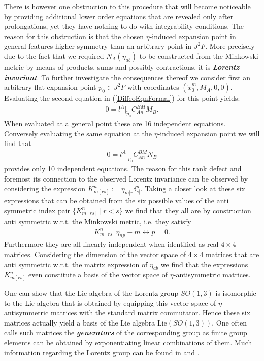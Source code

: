 \documentclass[a4paper,12pt, DIV=14, BCOR=5mm, twoside, headsepline, numbers=noenddot]{scrbook}
\begin{document}
There is however one obstruction to this procedure that will become noticeable by providing additional lower order equations that are revealed only after prolongations, yet they have nothing to do with integrability conditions. 
The reason for this obstruction is that the chosen $\eta$-induced expansion point in general features higher symmetry than an arbitrary point in $J^2F$. More precisely due to the fact that we required $N_A(\eta_{ab})$ to be constructed from the Minkowski metric by means of products, sums and possibly contractions, it is \textit{\textbf{Lorentz invariant}}. To further investigate the consequences thereof we consider first an arbitrary flat expansion point $\tilde{p}_0 \in J^2F$ with coordinates $(\tilde{x}_0^m,M_A,0,0)$. Evaluating the second equation in (\ref{DiffeoEqnFormal}) for this point yields:
\begin{align}
    0 = l^A \vert _{\tilde{p}_0} C^{BM}_{An}M_B.
\end{align}
When evaluated at a general point these are 16 independent equations. 
Conversely evaluating the same equation at the $\eta$-induced expansion point we will find that 
\begin{align}\label{RankDef}
    0 = l^A \vert_{p_0} C^{BM}_{An}N_B
\end{align}
provides only 10 independent equations. The reason for this rank defect and foremost its connection to the observed Lorentz invariance can be observed by considering the expression $K_{m[rs]}^n :=\eta_{m[r}\delta_{s]}^n$. 
Taking a closer look at these six expressions that can be obtained from the six possible values of the anti symmetric index pair  $\{K_{m[rs]}^n \ \vert \ r < s \} $ we find that they all are by construction anti symmetric w.r.t. the Minkowski metric, i.e. they satisfy 
\begin{align}
K_{m[rs]}^n\eta_{n p} - m \leftrightarrow p = 0.
\end{align}
Furthermore they are all linearly independent when identified as real $4 \times 4$ matrices. Considering the dimension of the vector space of $4 \times 4$ matrices that are anti symmetric w.r.t. the matrix expression of $\eta_{ab}$ we find that  the expressions $K_{m[rs]}^n$ even constitute a basis of the vector space of $\eta$-antisymmetric matrices. 

%
%
One can show that the Lie algebra of the Lorentz group $SO(1,3)$ is isomorphic to the Lie algebra that is obtained by equipping this vector space of $\eta$-antisymmetric matrices with the standard matrix commutator. Hence these six matrices actually yield a basis of the Lie algebra $\mathrm{Lie}(SO(1,3))$. One often calls such matrices the \textit{\textbf{generators}} of the corresponding group as finite group elements can be obtained by exponentiating linear combinations of them. Much information regarding the Lorentz group can be found in \cite{doi:10.1142/p199} and \cite{naimark2014linear}.
\end{document}
